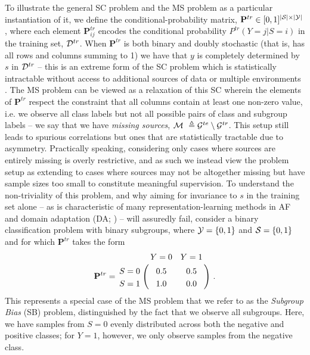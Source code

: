 To illustrate the general \ac{SC} problem and the \ac{MS} problem as a particular instantiation of
it, we define the conditional-probability matrix, \( \mathbf{P}^{tr} \in [0, 1]^{|{\mathcal{S}}| \times
|{\mathcal{Y}}|} \), where each element \( \mathbf{P}^{tr}_{ij} \) encodes the conditional probability \(
P^{tr}(Y=j|S=i) \) in the training set, \( {\mathcal{D}}^{tr} \). 
%
When \( \mathbf{P}^{tr} \) is both binary and doubly stochastic (that is, has all rows and columns
summing to 1) we have that \(y\) is completely determined by \(s\) in \( {\mathcal{D}}^{tr} \) -- this is an
extreme form of the \ac{SC} problem which is statistically intractable without access to additional
sources of data \citep{KehBarThoQua20} or multiple environments \citep{arjovsky2019invariant}. 
%
The \ac{MS} problem can be viewed as a relaxation of this \ac{SC} wherein the elements of \(
\mathbf{P}^{tr} \) respect the constraint that all columns contain at least one non-zero value,
i.e. we observe all class labels but not all possible pairs of class and subgroup labels -- we say
that we have \emph{missing sources}, \({\mathcal{M}}\ \triangleq {\mathcal{G}}^{te} \setminus {\mathcal{G}}^{tr}\). 
%
This setup still leads to spurious correlations but ones that are statistically tractable due to
asymmetry.
%
Practically speaking, considering only cases where sources are entirely missing is overly
restrictive, and as such we instead view the problem setup as extending to cases where sources may
not be altogether missing but have sample sizes too small to constitute meaningful supervision. 
%
To understand the non-triviality of this problem, and why aiming for invariance to \(s\) in the
training set alone -- as is characteristic of many representation-learning methods in \ac{AF}
\citep{edwards2015censoring, madras2018learning, quadrianto2019discovering}  and domain adaptation
(\ac{DA}; \citep{ganin2016domain, zhao2018adversarial, saito2018maximum, lee2019sliced}) -- will
assuredly fail, consider a binary classification problem with binary subgroups, where \({\mathcal{Y}} = \{ 0,
1 \}\) and \( {\mathcal{S}} = \{ 0, 1 \}\) and for which \( \mathbf{P}^{tr} \) takes the form
%
\begin{align}\label{ms_example}
  \mathbf{P}^{tr} = \bordermatrix{
  & Y=0 & Y=1 \cr
  S=0 & 0.5 & 0.5 \cr
  S=1 & 1.0 & 0.0}~.
\end{align}
%
This represents a special case of the \ac{MS} problem that we refer to as the \emph{Subgroup Bias}
(SB) problem, distinguished by the fact that we observe all subgroups. 
%
Here, we have samples from $S=0$ evenly distributed across both the negative and positive classes;
for $Y=1$, however, we only observe samples from the negative class. 
